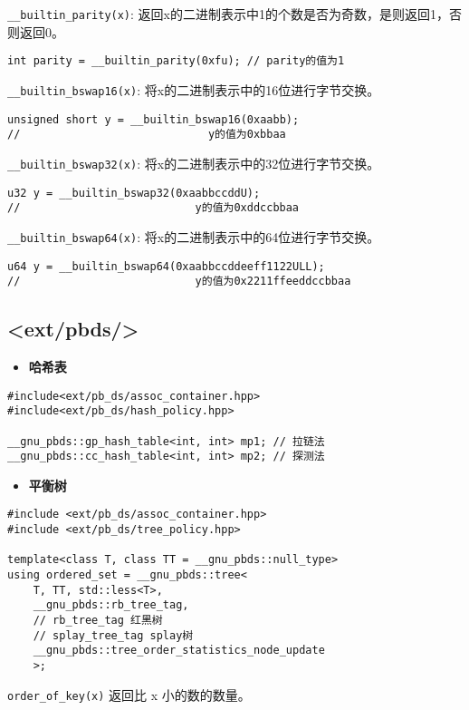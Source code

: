 \documentclass[a4paper,landscape,twocolumn]{ctexart}
\newcommand{\point}[1]{
	\begin{itemize}
		\item \textbf{#1}
	\end{itemize}
}
\begin{document}
\texttt{\_\_builtin\_parity(x)}: 返回x的二进制表示中1的个数是否为奇数，是则返回1，否则返回0。

\begin{lstlisting}
int parity = __builtin_parity(0xfu); // parity的值为1
\end{lstlisting}

\texttt{\_\_builtin\_bswap16(x)}: 将x的二进制表示中的16位进行字节交换。
\begin{lstlisting}
unsigned short y = __builtin_bswap16(0xaabb);
//                             y的值为0xbbaa
\end{lstlisting}

\texttt{\_\_builtin\_bswap32(x)}: 将x的二进制表示中的32位进行字节交换。

\begin{lstlisting}
u32 y = __builtin_bswap32(0xaabbccddU);
//                           y的值为0xddccbbaa
\end{lstlisting}

\texttt{\_\_builtin\_bswap64(x)}: 将x的二进制表示中的64位进行字节交换。
\begin{lstlisting}
u64 y = __builtin_bswap64(0xaabbccddeeff1122ULL);
//                           y的值为0x2211ffeeddccbbaa
\end{lstlisting}

\subsection{<ext/pbds/>}

\point{哈希表}

\begin{lstlisting}
#include<ext/pb_ds/assoc_container.hpp>
#include<ext/pb_ds/hash_policy.hpp>

__gnu_pbds::gp_hash_table<int, int> mp1; // 拉链法
__gnu_pbds::cc_hash_table<int, int> mp2; // 探测法
\end{lstlisting}

\point{平衡树}

\begin{lstlisting}
#include <ext/pb_ds/assoc_container.hpp>
#include <ext/pb_ds/tree_policy.hpp>

template<class T, class TT = __gnu_pbds::null_type>
using ordered_set = __gnu_pbds::tree<
	T, TT, std::less<T>,
	__gnu_pbds::rb_tree_tag,
	// rb_tree_tag 红黑树
	// splay_tree_tag splay树
	__gnu_pbds::tree_order_statistics_node_update
	>;
\end{lstlisting}

\texttt{order\_of\_key(x)}  返回比 x 小的数的数量。
\end{document}
